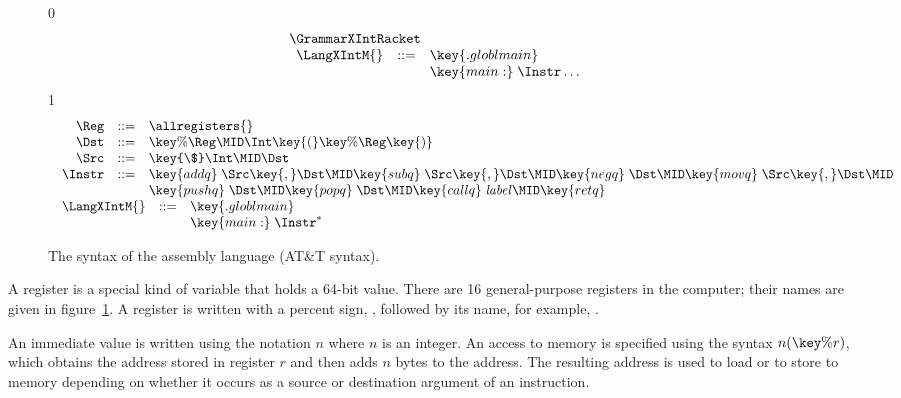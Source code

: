 \documentclass[7x10]{TimesAPriori_MIT}%
\def\racketEd{0}
\def\pythonEd{1}
\providecommand{\BookEdition}{1}
\let\edition\BookEdition
\newcommand{\pythonColor}[0]{}
\numberwithin{theorem}{chapter}
\numberwithin{definition}{chapter}
\numberwithin{equation}{chapter}
\begin{document}
\newcommand{\GrammarXIntPython}{
\begin{array}{rcl}
\Reg &::=& \allregisters{} \\
\Dst &::=&  \key{\%}\Reg \MID \Int\key{(}\key{\%}\Reg\key{)}\\
\Src &::=&  \key{\$}\Int \MID \Dst \\
\Instr &::=& \key{addq} \; \Src\key{,} \Dst \MID
      \key{subq} \; \Src\key{,} \Dst \MID
      \key{negq} \; \Dst \MID \key{movq} \; \Src\key{,} \Dst \MID \\
  &&  \key{pushq}\;\Dst \MID \key{popq}\;\Dst \MID 
      \key{callq} \; \mathit{label} \MID \key{retq} 
\end{array}
}

\begin{figure}[tp]
\begin{tcolorbox}[colback=white]
{\if\edition\racketEd    
\[
\begin{array}{l}
  \GrammarXIntRacket \\
\begin{array}{lcl}
\LangXIntM{} &::= & \key{.globl main}\\
      &    & \key{main:} \; \Instr\ldots
\end{array}
\end{array}
\]
\fi}
{\if\edition\pythonEd\pythonColor
\[
\begin{array}{l}
  \GrammarXIntPython \\
\begin{array}{lcl}
\LangXIntM{} &::= & \key{.globl main}\\
      &    & \key{main:} \; \Instr^{*}
\end{array}
\end{array}
\]
\fi}
\end{tcolorbox}
\caption{The syntax of the \LangXInt{} assembly language (AT\&T syntax).}
\label{fig:x86-int-concrete}
\end{figure}

A register is a special kind of variable that holds a 64-bit
value. There are 16 general-purpose registers in the computer; their
names are given in figure~\ref{fig:x86-int-concrete}.  A register is
written with a percent sign, \key{\%}, followed by its name,
for example, .

An immediate value is written using the notation \key{\$}$n$ where $n$
is an integer.
%
%
An access to memory is specified using the syntax $n(\key{\%}r)$,
which obtains the address stored in register $r$ and then adds $n$
bytes to the address. The resulting address is used to load or to store
to memory depending on whether it occurs as a source or destination
argument of an instruction.
\end{document}
